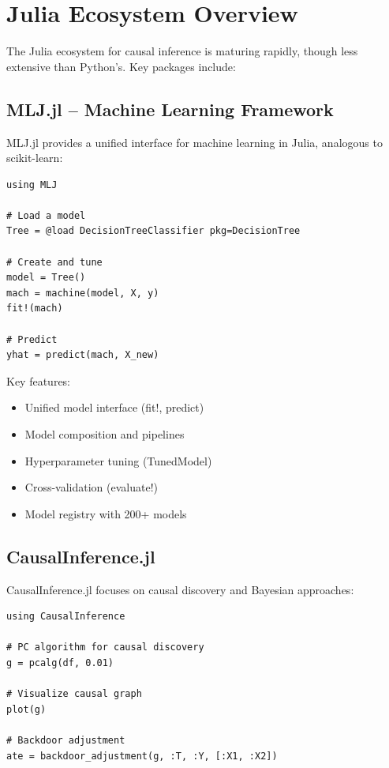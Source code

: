 \section{Julia Ecosystem Overview}\label{sec:julia_ecosystem}

The Julia ecosystem for causal inference is maturing rapidly, though less extensive than Python's. Key packages include:

\subsection{MLJ.jl -- Machine Learning Framework}

MLJ.jl provides a unified interface for machine learning in Julia, analogous to scikit-learn:

\begin{verbatim}
using MLJ

# Load a model
Tree = @load DecisionTreeClassifier pkg=DecisionTree

# Create and tune
model = Tree()
mach = machine(model, X, y)
fit!(mach)

# Predict
yhat = predict(mach, X_new)
\end{verbatim}

Key features:
\begin{itemize}
    \item Unified model interface (fit!, predict)
    \item Model composition and pipelines
    \item Hyperparameter tuning (TunedModel)
    \item Cross-validation (evaluate!)
    \item Model registry with 200+ models
\end{itemize}

\subsection{CausalInference.jl}

CausalInference.jl focuses on causal discovery and Bayesian approaches:

\begin{verbatim}
using CausalInference

# PC algorithm for causal discovery
g = pcalg(df, 0.01)

# Visualize causal graph
plot(g)

# Backdoor adjustment
ate = backdoor_adjustment(g, :T, :Y, [:X1, :X2])
\end{verbatim}


